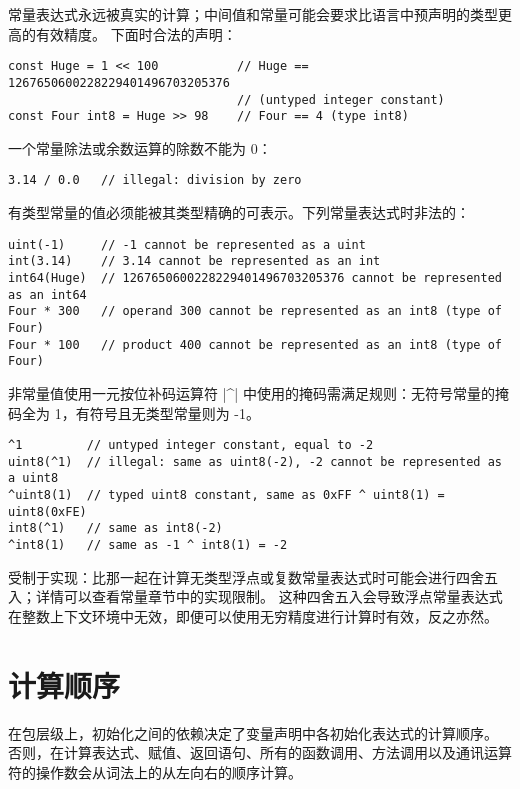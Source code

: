 常量表达式永远被真实的计算；中间值和常量可能会要求比语言中预声明的类型更高的有效精度。
下面时合法的声明：
\begin{lstlisting}[style=golang]
const Huge = 1 << 100			// Huge == 1267650600228229401496703205376  
								// (untyped integer constant)
const Four int8 = Huge >> 98  	// Four == 4 (type int8)
\end{lstlisting}

一个常量除法或余数运算的除数不能为 0：
\begin{lstlisting}[style=golang]
3.14 / 0.0   // illegal: division by zero
\end{lstlisting}

有类型常量的值必须能被其类型精确的可表示。下列常量表达式时非法的：
\begin{lstlisting}[style=golang]
uint(-1)     // -1 cannot be represented as a uint
int(3.14)    // 3.14 cannot be represented as an int
int64(Huge)  // 1267650600228229401496703205376 cannot be represented as an int64
Four * 300   // operand 300 cannot be represented as an int8 (type of Four)
Four * 100   // product 400 cannot be represented as an int8 (type of Four)
\end{lstlisting}

非常量值使用一元按位补码运算符 \code|^| 中使用的掩码需满足规则：无符号常量的掩码全为 1，有符号且无类型常量则为 -1。
\begin{lstlisting}[style=golang]
^1         // untyped integer constant, equal to -2
uint8(^1)  // illegal: same as uint8(-2), -2 cannot be represented as a uint8
^uint8(1)  // typed uint8 constant, same as 0xFF ^ uint8(1) = uint8(0xFE)
int8(^1)   // same as int8(-2)
^int8(1)   // same as -1 ^ int8(1) = -2
\end{lstlisting}

受制于实现：比那一起在计算无类型浮点或复数常量表达式时可能会进行四舍五入；详情可以查看常量章节中的实现限制。
这种四舍五入会导致浮点常量表达式在整数上下文环境中无效，即便可以使用无穷精度进行计算时有效，反之亦然。

\section{计算顺序}
在包层级上，初始化之间的依赖决定了变量声明中各初始化表达式的计算顺序。
否则，在计算表达式、赋值、返回语句、所有的函数调用、方法调用以及通讯运算符的操作数会从词法上的从左向右的顺序计算。

